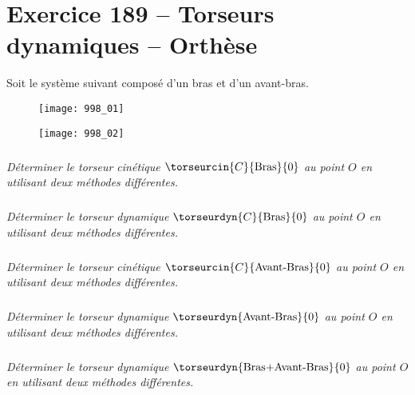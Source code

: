 \section*{Exercice 189 -- Torseurs dynamiques -- Orthèse}
\setcounter{exo}{0}


Soit le système suivant composé d'un bras et d'un avant-bras.

\begin{figure}[H]
\centering
\texttt{[image: 998\_01]}
\end{figure}

\begin{figure}[H]
\centering
\texttt{[image: 998\_02]}
\end{figure}

\subparagraph{}
\textit{Déterminer le torseur cinétique $\torseurcin{C}{\text{Bras}}{0}$ au point $O$ en utilisant deux méthodes différentes.}
\ifprof
\begin{corrige}
\end{corrige}
\else
\fi

\subparagraph{}
\textit{Déterminer le torseur dynamique $\torseurdyn{C}{\text{Bras}}{0}$ au point $O$ en utilisant deux méthodes différentes.}
\ifprof
\begin{corrige}
\end{corrige}
\else
\fi

\subparagraph{}
\textit{Déterminer le torseur cinétique $\torseurcin{C}{\text{Avant-Bras}}{0}$ au point $O$ en utilisant deux méthodes différentes.}
\ifprof
\begin{corrige}
\end{corrige}
\else
\fi

\subparagraph{}
\textit{Déterminer le torseur dynamique $\torseurdyn{\text{Avant-Bras}}{0}$ au point $O$ en utilisant deux méthodes différentes.}
\ifprof
\begin{corrige}
\end{corrige}
\else
\fi


\subparagraph{}
\textit{Déterminer le torseur dynamique $\torseurdyn{\text{Bras+Avant-Bras}}{0}$ au point $O$ en utilisant deux méthodes différentes.}
\ifprof
\begin{corrige}
\end{corrige}
\else
\fi

